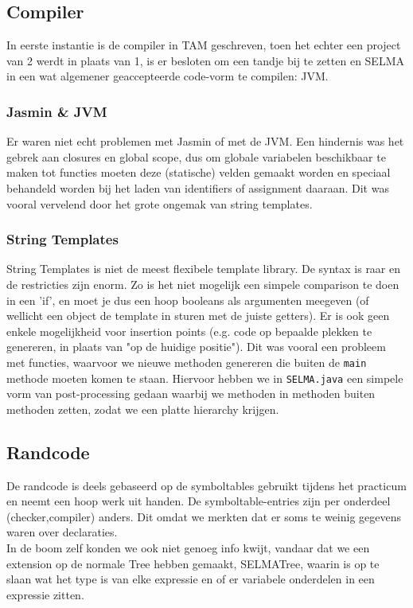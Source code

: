 \documentclass[]{article}
\begin{document}
\subsection{Compiler}
In eerste instantie is de compiler in TAM geschreven, toen het echter een project van 2 werdt in plaats van 1, is er besloten om een tandje bij te zetten en SELMA in een wat algemener geaccepteerde code-vorm te compilen: JVM.\\
\subsubsection{Jasmin \& JVM}
Er waren niet echt problemen met Jasmin of met de JVM. Een hindernis was het gebrek aan closures en global scope, dus om globale variabelen beschikbaar te maken tot functies moeten deze (statische) velden gemaakt worden en speciaal behandeld worden bij het laden van identifiers of assignment daaraan. Dit was vooral vervelend door het grote ongemak van string templates.\\
\subsubsection{String Templates}
String Templates is niet de meest flexibele template library. De syntax is raar en de restricties zijn enorm. Zo is het niet mogelijk een simpele comparison te doen in een 'if', en moet je dus een hoop booleans als argumenten meegeven (of wellicht een object de template in sturen met de juiste getters). Er is ook geen enkele mogelijkheid voor insertion points (e.g. code op bepaalde plekken te genereren, in plaats van "op de huidige positie"). Dit was vooral een probleem met functies, waarvoor we nieuwe methoden genereren die buiten de \texttt{main} methode moeten komen te staan. Hiervoor hebben we in \texttt{SELMA.java} een simpele vorm van post-processing gedaan waarbij we methoden in methoden buiten methoden zetten, zodat we een platte hierarchy krijgen.
\subsection{Randcode}
De randcode is deels gebaseerd op de symboltables gebruikt tijdens het practicum en neemt een hoop werk uit handen. De symboltable-entries zijn per onderdeel (checker,compiler) anders. Dit omdat we merkten dat er soms te weinig gegevens waren over declaraties. \\
In de boom zelf konden we ook niet genoeg info kwijt, vandaar dat we een extension op de normale Tree hebben gemaakt, SELMATree, waarin is op te slaan wat het type is van elke expressie en of er variabele onderdelen in een expressie zitten.
\end{document}
